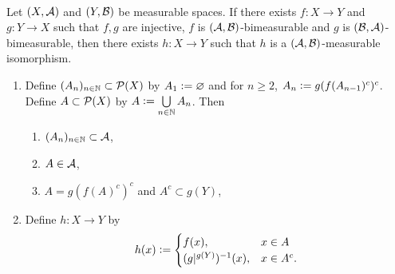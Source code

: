 \documentclass{book}
\begin{document}
	\begin{ex}   \\
		Let $(X, \mathcal{A})$ and $(Y, \mathcal{B})$ be measurable spaces. If there exists $f:X \rightarrow Y$ and $g: Y \rightarrow X$ such that $f,g$ are injective, $f$ is $(\mathcal{A}, \mathcal{B})$-bimeasurable and $g$ is $(\mathcal{B}, \mathcal{A})$-bimeasurable, then there exists $h: X \rightarrow Y$ such that $h$ is a $(\mathcal{A}, \mathcal{B})$-measurable isomorphism. \\
		\begin{enumerate}
			\item Define $(A_n)_{n \in \mathbb{N}} \subset \mathcal{P}(X)$ by $A_1 \vcentcolon= \varnothing$ and for $n \geq 2$, $A_n \vcentcolon= g(f(A_{n-1})^c)^c$. Define $A \subset \mathcal{P}(X)$ by $A \vcentcolon= \bigcup\limits_{n \in \mathbb{N}} A_n$.
			Then 
			\begin{enumerate}
				\item $(A_n)_{n \in \mathbb{N}} \subset \mathcal{A}$,
				\item $A \in \mathcal{A}$,
				\item $A = g(f(A)^c)^c$ and $A^c \subset g(Y)$, 
			\end{enumerate}
			\item Define $h:X \rightarrow Y$ by 
			\[
			h(x) \vcentcolon= 
			\begin{cases}
				f(x), & x \in A \\
				(g|^{g(Y)})^{-1}(x),  & x \in A^c.
			\end{cases}
			\]
		\end{enumerate}
	\end{ex}
	
\end{document}
